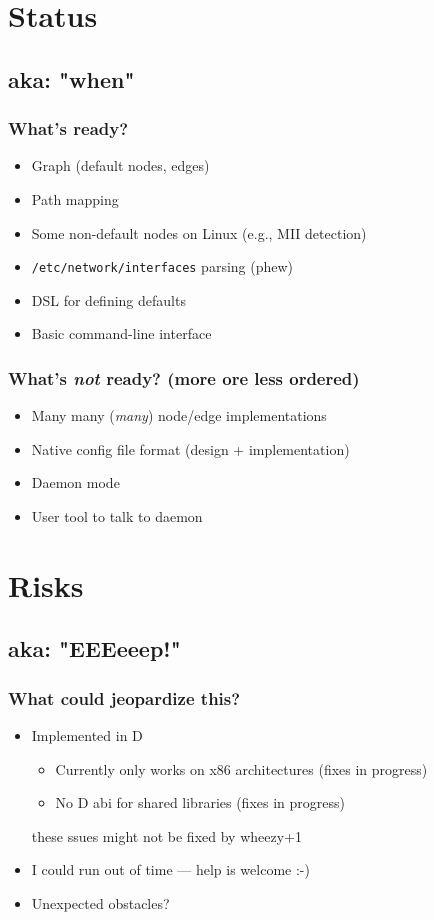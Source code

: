 \documentclass[ignorenonframetext]{beamer}
\begin{document}
\section{Status}
\subsection{aka: "when"}
\begin{frame}
  \frametitle{What's ready?}
  \begin{itemize}
    \item Graph (default nodes, edges)
    \item Path mapping
    \item Some non-default nodes on Linux (e.g., MII detection)
    \item \texttt{/etc/network/interfaces} parsing (phew)
    \item DSL for defining defaults
    \item Basic command-line interface
  \end{itemize}
\end{frame}

\begin{frame}
  \frametitle{What's \emph{not} ready? (more ore less ordered)}
  \begin{itemize}
    \item Many many (\emph{many}) node/edge implementations
    \item Native config file format (design + implementation)
    \item Daemon mode
    \item User tool to talk to daemon
  \end{itemize}
\end{frame}

\section{Risks}
\subsection{aka: "EEEeeep!"}
\begin{frame}
  \frametitle{What could jeopardize this?}
  \begin{itemize}
    \item Implemented in D
    \begin{itemize}
      \item Currently only works on x86 architectures (fixes in progress)
      \item No D abi for shared libraries (fixes in progress)
    \end{itemize}

    these ssues might not be fixed by wheezy+1

    \item I could run out of time --- help is welcome :-)
    \item Unexpected obstacles?
  \end{itemize}
\end{frame}
\end{document}
